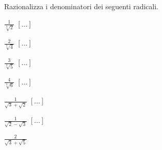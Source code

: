\begin{esercizio}
 \label{ese:2.72}
Razionalizza i denominatori dei seguenti radicali.
 \begin{multicols}{4}
 \begin{enumeratea}
 \item $\frac 1{\sqrt[3]2}$
  \hfill $\left[...\right]$
 \item $\frac 2{\sqrt[3]4}$
  \hfill $\left[...\right]$
 \item $\frac 3{\sqrt[3]5}$
  \hfill $\left[...\right]$
 \item $\frac 4{\sqrt[3]6}$
  \hfill $\left[...\right]$
 \item $\frac 1{\sqrt 3+\sqrt 2}$
  \hfill $\left[...\right]$
 \item $\frac 1{\sqrt 2-\sqrt 3}$
  \hfill $\left[...\right]$
 \item $\frac 2{\sqrt 3+\sqrt 5}$

\end{enumeratea}
\end{multicols}
\end{esercizio}

